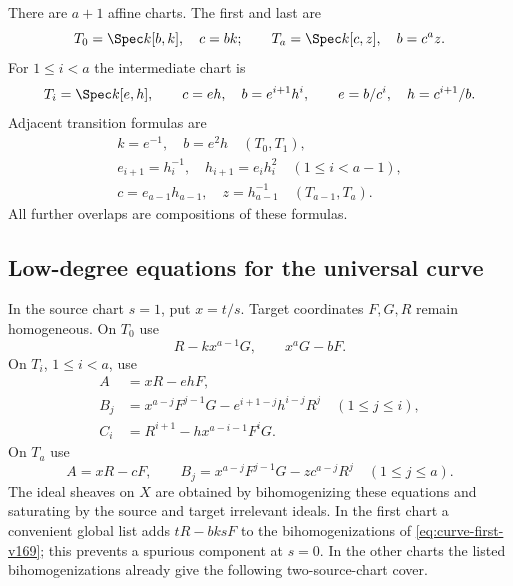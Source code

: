 There are $a+1$ affine charts. The first and last are
\[
 T_0=\Spec k[b,k],\quad c=bk;
 \qquad T_a=\Spec k[c,z],\quad b=c^az.
\]
For $1\leq i<a$ the intermediate chart is
\begin{equation}\label{eq:chain-charts-v169}
 T_i=\Spec k[e,h],\qquad c=eh,\quad b=e^{i+1}h^i,
 \qquad e=b/c^i,\quad h=c^{i+1}/b.
\end{equation}
Adjacent transition formulas are
\begin{equation}\label{eq:chain-transitions-v169}
 \begin{gathered}
 k=e^{-1},\quad b=e^2h \quad(T_0,T_1),\\
 e_{i+1}=h_i^{-1},\quad h_{i+1}=e_i h_i^2
                  \quad(1\leq i<a-1),\\
 c=e_{a-1}h_{a-1},\quad z=h_{a-1}^{-1}
                  \quad(T_{a-1},T_a).
 \end{gathered}
\end{equation}
All further overlaps are compositions of these formulas.

\subsection{Low-degree equations for the universal curve}
In the source chart $s=1$, put $x=t/s$. Target coordinates $F,G,R$
remain homogeneous. On $T_0$ use
\begin{equation}\label{eq:curve-first-v169}
 R-kx^{a-1}G,\qquad x^aG-bF.
\end{equation}
On $T_i$, $1\leq i<a$, use
\begin{equation}\label{eq:curve-middle-v169}
 \begin{split}
 A&=xR-ehF,\\
 B_j&=x^{a-j}F^{j-1}G-e^{i+1-j}h^{i-j}R^j\quad(1\leq j\leq i),\\
 C_i&=R^{i+1}-h x^{a-i-1}F^iG.
 \end{split}
\end{equation}
On $T_a$ use
\begin{equation}\label{eq:curve-last-v169}
 A=xR-cF,\qquad
 B_j=x^{a-j}F^{j-1}G-zc^{a-j}R^j\quad(1\leq j\leq a).
\end{equation}
The ideal sheaves on $X$ are obtained by bihomogenizing these equations
and saturating by the source and target irrelevant ideals. In the
first chart a convenient global list adds $tR-bksF$ to the
bihomogenizations of \eqref{eq:curve-first-v169}; this prevents a
spurious component at $s=0$. In the other charts the listed
bihomogenizations already give the following two-source-chart cover.

